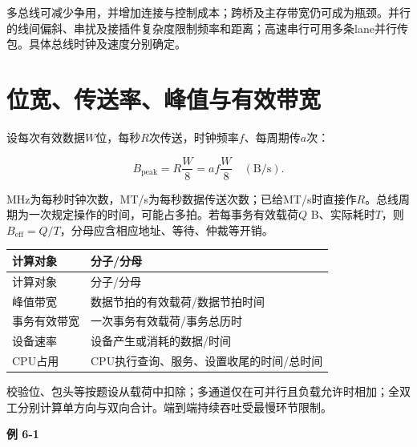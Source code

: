 多总线可减少争用，并增加连接与控制成本；跨桥及主存带宽仍可成为瓶颈。并行的线间偏斜、串扰及接插件复杂度限制频率和距离；高速串行可用多条lane并行传包。具体总线时钟及速度分别确定。

\section{位宽、传送率、峰值与有效带宽}\label{CO06-bandwidth}

设每次有效数据\(W\)位，每秒\(R\)次传送，时钟频率\(f\)、每周期传\(a\)次：

\[
B_{\mathrm{peak}}=R\frac W8=af\frac W8\quad(\mathrm{B/s}).
\]

MHz为每秒时钟次数，MT/s为每秒数据传送次数；已给MT/s时直接作\(R\)。总线周期为一次规定操作的时间，可能占多拍。若每事务有效载荷\(Q\) B、实际耗时\(T\)，则\(B_{\mathrm{eff}}=Q/T\)，分母应含相应地址、等待、仲裁等开销。

\par\smallskip
{\fontsize{9.3}{12}\selectfont\setlength{\tabcolsep}{2.5pt}\setlength{\LTleft}{0pt}\setlength{\LTright}{0pt}
\begin{longtable}{@{}>{\raggedright\arraybackslash}p{}>{\raggedright\arraybackslash}p{}@{}}
\toprule
计算对象 & 分子/分母 \\

\midrule\endfirsthead\toprule
计算对象 & 分子/分母 \\

\midrule\endhead\bottomrule\endfoot
峰值带宽 & 数据节拍的有效载荷/数据节拍时间 \\

事务有效带宽 & 一次事务有效载荷/事务总历时 \\

设备速率 & 设备产生或消耗的数据/时间 \\

CPU占用 & CPU执行查询、服务、设置收尾的时间/总时间 \\

\end{longtable}}
\par\smallskip

校验位、包头等按题设从载荷中扣除；多通道仅在可并行且负载允许时相加；全双工分别计算单方向与双向合计。端到端持续吞吐受最慢环节限制。

\par\medskip{}\noindent\hypertarget{CO06-E01}{}\label{CO06-E01}\textbf{例 6-1}\par\nobreak\smallskip


